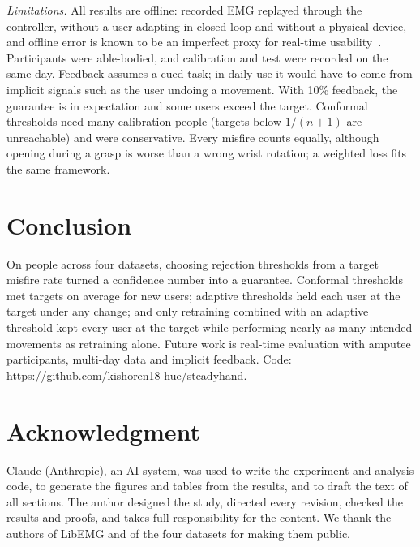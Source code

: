 \documentclass[conference]{IEEEtran}
\begin{document}
\emph{Limitations.} All results are offline: recorded EMG replayed through the controller, without a user adapting in closed loop and without a physical device, and offline error is known to be an imperfect proxy for real-time usability~\cite{robertson2019}. Participants were able-bodied, and calibration and test were recorded on the same day. Feedback assumes a cued task; in daily use it would have to come from implicit signals such as the user undoing a movement. With 10\% feedback, the guarantee is in expectation and some users exceed the target. Conformal thresholds need many calibration people (targets below $1/(n+1)$ are unreachable) and were conservative. Every misfire counts equally, although opening during a grasp is worse than a wrong wrist rotation; a weighted loss fits the same framework.

\section{Conclusion}

On \nPeople{} people across four datasets, choosing rejection thresholds from a target misfire rate turned a confidence number into a guarantee. Conformal thresholds met targets on average for new users; adaptive thresholds held each user at the target under any change; and only retraining combined with an adaptive threshold kept every user at the target while performing nearly as many intended movements as retraining alone. Future work is real-time evaluation with amputee participants, multi-day data and implicit feedback. Code: \url{https://github.com/kishoren18-hue/steadyhand}.

\section*{Acknowledgment}
Claude (Anthropic), an AI system, was used to write the experiment and analysis code, to generate the figures and tables from the results, and to draft the text of all sections. The author designed the study, directed every revision, checked the results and proofs, and takes full responsibility for the content. We thank the authors of LibEMG and of the four datasets for making them public.
\end{document}

